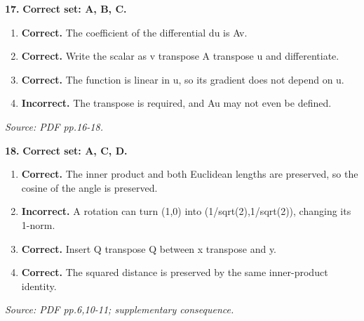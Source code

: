 \documentclass[11pt,a4paper]{article}
\begin{document}
\par\noindent\begin{minipage}{\linewidth}
\textbf{17.} \textbf{Correct set: A, B, C.}
\begin{enumerate}[label=(\Alph*),leftmargin=8mm,itemsep=2pt,topsep=2pt]
\item \textbf{Correct.} The coefficient of the differential du is Av.
\item \textbf{Correct.} Write the scalar as v transpose A transpose u and differentiate.
\item \textbf{Correct.} The function is linear in u, so its gradient does not depend on u.
\item \textbf{Incorrect.} The transpose is required, and Au may not even be defined.
\end{enumerate}
{\footnotesize\textit{Source: PDF pp.16-18.}}

\end{minipage}\par\vspace{3mm}
\par\noindent\begin{minipage}{\linewidth}
\textbf{18.} \textbf{Correct set: A, C, D.}
\begin{enumerate}[label=(\Alph*),leftmargin=8mm,itemsep=2pt,topsep=2pt]
\item \textbf{Correct.} The inner product and both Euclidean lengths are preserved, so the cosine of the angle is preserved.
\item \textbf{Incorrect.} A rotation can turn (1,0) into (1/sqrt(2),1/sqrt(2)), changing its 1-norm.
\item \textbf{Correct.} Insert Q transpose Q between x transpose and y.
\item \textbf{Correct.} The squared distance is preserved by the same inner-product identity.
\end{enumerate}
{\footnotesize\textit{Source: PDF pp.6,10-11; supplementary consequence.}}

\end{minipage}\par\vspace{3mm}
\end{document}
